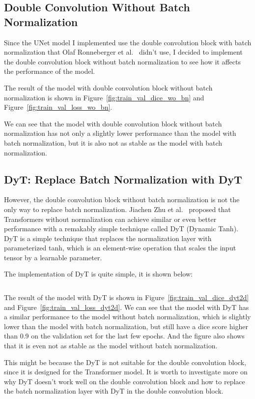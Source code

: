 \subsection{Double Convolution Without Batch Normalization}

Since the UNet model I implemented use the double convolution block with batch normalization that Olaf Ronneberger et al.~\cite{UNet} didn't use, I decided to implement the double convolution block without batch normalization to see how it affects the performance of the model.

The result of the model with double convolution block without batch normalization is shown in Figure~\ref{fig:train_val_dice_wo_bn} and Figure~\ref{fig:train_val_loss_wo_bn}.


We can see that the model with double convolution block without batch normalization has not only a slightly lower performance than the model with batch normalization, but it is also not as stable as the model with batch normalization.

\subsection{DyT: Replace Batch Normalization with DyT}
\label{sec:dyt}

However, the double convolution block without batch normalization is not the only way to replace batch normalization.
Jiachen Zhu et al.~\cite{DyT} proposed that Transformers without normalization can achieve similar or even better performance with a remakably simple technique called DyT  (Dynamic Tanh).
DyT is a simple technique that replaces the normalization layer with parameterized tanh, which is an element-wise operation that scales the input tensor by a learnable parameter.

The implementation of DyT is quite simple, it is shown below:

\inputminted[firstline=5, lastline=20]{python}{../src/models/common.py}

The result of the model with DyT is shown in Figure~\ref{fig:train_val_dice_dyt2d} and Figure~\ref{fig:train_val_loss_dyt2d}.
We can see that the model with DyT has a similar performance to the model without batch normalization, which is slightly lower than the model with batch normalization, but still have a dice score higher than 0.9 on the validation set for the last few epochs.
And the figure also shows that it is even not as stable as the model without batch normalization.

This might be because the DyT is not suitable for the double convolution block, since it is designed for the Transformer model.
It is worth to investigate more on why DyT doesn't work well on the double convolution block and how to replace the batch normalization layer with DyT in the double convolution block.

